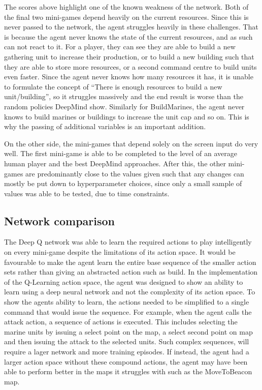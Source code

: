 The scores above highlight one of the known weakness of the network. Both of the
final two mini-games depend heavily on the current resources. Since this is
never passed to the network, the agent struggles heavily in these challenges.
That is because the agent never knows the state of the current resources, and as
such can not react to it. For a player, they can see they are able to build a
new gathering unit to increase their production, or to build a new building such
that they are able to store more resources, or a second command centre to build
units even faster. Since the agent never knows how many resources it has, it is
unable to formulate the concept of ``There is enough resources to build a new
unit/building'', so it struggles massively and the end result is worse than the
random policies DeepMind show. Similarly for BuildMarines, the agent never knows
to build marines or buildings to increase the unit cap and so on. This is why
the passing of additional variables is an important addition.

On the other side, the mini-games that depend solely on the screen input do very
well. The first mini-game is able to be completed to the level of an average
human player and the best DeepMind approaches. After this, the other mini-games
are predominantly close to the values given such that any changes can mostly be
put down to hyperparameter choices, since only a small sample of values was able
to be tested, due to time constraints.

\subsection{Network comparison}

The Deep Q network was able to learn the required actions to play intelligently
on every mini-game despite the limitations of its action space. It would be
favourable to make the agent learn the entire base sequence of the smaller
action sets rather than giving an abstracted action such as build. In the
implementation of the Q-Learning action space, the agent was designed to show an
ability to learn using a deep neural network and not the complexity of its
action space. To show the agents ability to learn, the actions needed to be
simplified to a single command that would issue the sequence. For example, when
the agent calls the attack action, a sequence of actions is executed. This
includes selecting the marine units by issuing a select point on the map, a
select second point on map and then issuing the attack to the selected units.
Such complex sequences, will require a lager network and more training episodes.
If instead, the agent had a larger action space without these compound actions,
the agent may have been able to perform better in the maps it struggles with
such as the MoveToBeacon map.

